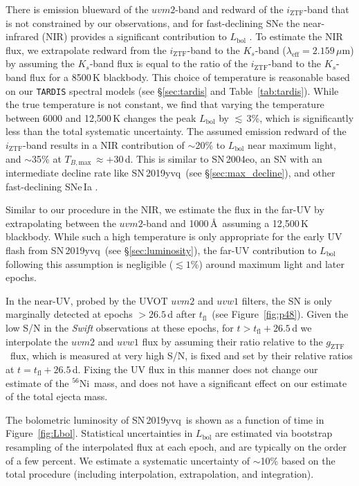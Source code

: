 \documentclass[twocolumn]{aastex63}
\newcommand{\gztf}{$g_\mathrm{ZTF}$}
\newcommand{\iztf}{$i_\mathrm{ZTF}$}
\newcommand{\tfl}{$t_\mathrm{fl}$}
\newcommand{\tbmax}{$T_{B,\mathrm{max}}$}
\newcommand{\radni}{$^{56}$Ni}
\newcommand{\sn}{SN\,2019yvq}
\begin{document}
There is emission blueward of the $uvm2$-band and redward of the \iztf-band
that is not constrained by our observations, and for fast-declining SNe the
near-infrared (NIR) provides a significant contribution to $L_\mathrm{bol}$
\citep[e.g.,][]{Taubenberger08}. To estimate the NIR flux, we extrapolate
redward from the \iztf-band to the $K_s$-band ($\lambda_\mathrm{eff} =
2.159\,\mu$m) by assuming the $K_s$-band flux is equal to the ratio of the
\iztf-band to the $K_s$-band flux for a 8500\,K blackbody. This choice of
temperature is reasonable based on our \texttt{TARDIS} spectral models (see
\S\ref{sec:tardis} and Table~\ref{tab:tardis}). While the true temperature is
not constant, we find that varying the temperature between 6000 and 12,500\,K
changes the peak $L_\mathrm{bol}$ by $\lesssim\,3$\%, which is significantly
less than the total systematic uncertainty. The assumed emission redward of
the \iztf-band results in a NIR contribution of $\sim$20\% to $L_\mathrm{bol}$
near maximum light, and $\sim$35\% at \tbmax\,$\approx +30$\,d. This is
similar to SN\,2004eo, an SN with an intermediate decline rate like \sn\ (see
\S\ref{sec:max_decline}), and other fast-declining SNe\,Ia
\citep{Taubenberger08}.

Similar to our procedure in the NIR, we estimate the flux in the far-UV
by extrapolating between the $uvm2$-band and 1000\,\AA\ assuming a 12,500\,K
blackbody. While such a high temperature is only appropriate for the early UV
flash from \sn\ (see \S\ref{sec:luminosity}), the far-UV contribution
to $L_\mathrm{bol}$ following this assumption is negligible ($\lesssim 1$\%)
around maximum light and later epochs.

In the near-UV, probed by the UVOT $uvm2$ and $uvw1$ filters, the SN is
only marginally detected at epochs $> 26.5$\,d after \tfl\ (see
Figure~\ref{fig:p48}). Given the low S/N in the
\textit{Swift} observations at these epochs, for $t > t_\mathrm{fl} + 26.5$\,d
we interpolate the $uvm2$ and $uvw1$ flux by assuming their ratio relative to
the \gztf\ flux, which is measured at very high S/N, is fixed and set by their
relative ratios at $t = t_\mathrm{fl} + 26.5$\,d. Fixing the UV flux in this
manner does not change our estimate of the \radni\ mass, and does not have a
significant effect on our estimate of the total ejecta mass.

The bolometric luminosity of \sn\ is shown as a function of time in
Figure~\ref{fig:Lbol}. Statistical uncertainties in $L_\mathrm{bol}$ are
estimated via bootstrap resampling of the interpolated flux at each epoch, and
are typically on the order of a few percent. We estimate a systematic
uncertainty of $\sim$10\% based on the total procedure (including
interpolation, extrapolation, and integration). 
\end{document}
